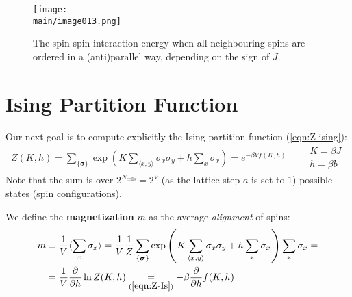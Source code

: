 \documentclass[../../main.tex]{subfiles}
\begin{document}
\begin{figure}[H]
    \centering
    \texttt{[image: \\main/image013.png]} 
    \caption{The spin-spin interaction energy when all neighbouring spins are ordered in a (anti)parallel way, depending on the sign of $J$.\label{fig:orders}}
\end{figure}

\section{Ising Partition Function}
Our next goal is to compute explicitly the Ising partition function (\ref{eqn:Z-ising}):
\begin{align}\label{eqn:Z-Is}
    Z(K,h) = \sum_{\{\bm{\sigma}\}} \exp\left(K \sum_{\langle x,y \rangle} \sigma_x \sigma_y + h \sum_x \sigma_x\right) = e^{-\beta V f(K,h)} \qquad \substack{K = \beta J\\h = \beta b}
\end{align}
Note that the sum is over $2^{N_{\mathrm{cells}}} = 2^V$ (as the lattice step $a$ is set to $1$) possible states (spin configurations).

\medskip

We define the \textbf{magnetization} $m$ as the average \textit{alignment} of spins:
\begin{align} \nonumber
    m &\equiv \frac{1}{V} \langle \sum_x \sigma_x \rangle =  \frac{1}{V} \frac{1}{Z} \sum_{\{\bm{\sigma}\}} \exp\left(K \sum_{\langle x,y \rangle} \sigma_x \sigma_y + h \sum_x \sigma_x\right) \sum_x \sigma_x =\\
    &= \frac{1}{V} \pdv{h} \ln Z(K, h) \underset{(\ref{eqn:Z-Is})}{=}  - \beta \pdv{h} f(K,h)  \label{eqn:magnetization}
\end{align}  
\end{document}
